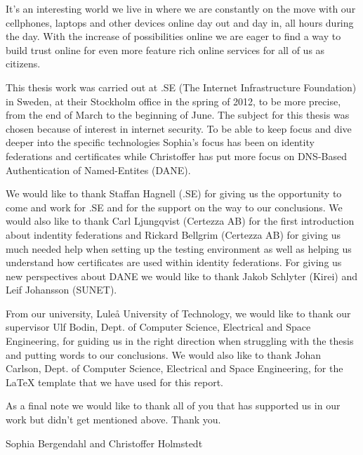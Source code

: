 It's an interesting world we live in where we are constantly on the move with our cellphones, laptops and other devices online day out and day in, all hours during the day.
With the increase of possibilities online we are eager to find a way to build trust online for even more feature rich online services for all of us as citizens.%

This thesis work was carried out at .SE (The Internet Infrastructure Foundation) in Sweden, at their Stockholm office in the spring of 2012, to be more precise, from the end of March to the beginning of June.
The subject for this thesis was chosen because of interest in internet security.
To be able to keep focus and dive deeper into the specific technologies Sophia's focus has been on identity federations and certificates while Christoffer has put more focus on DNS-Based Authentication of Named-Entites (DANE).

We would like to thank Staffan Hagnell (.SE) for giving us the opportunity to come and work for .SE and for the support on the way to our conclusions.
We would also like to thank Carl Ljungqvist (Certezza AB) for the first introduction about indentity federations and Rickard Bellgrim (Certezza AB) for giving us much needed help when setting up the testing environment as well as helping us understand how certificates are used within identity federations.
For giving us new perspectives about DANE we would like to thank Jakob Schlyter (Kirei) and Leif Johansson (SUNET). 

From our university, Lule\r{a} University of Technology, we would like to thank our 
supervisor Ulf Bodin, Dept. of Computer Science, Electrical and Space Engineering, 
for guiding us in the right direction when struggling with the thesis and putting words to our conclusions.
We would also like to thank Johan Carlson, Dept. of Computer Science, Electrical and Space Engineering, 
for the LaTeX template that we have used for this report. 

As a final note we would like to thank all of you that has supported us in our work but didn't get mentioned above.
Thank you.




%



\vspace*{1.5cm}%
\hfill Sophia Bergendahl and Christoffer Holmstedt
